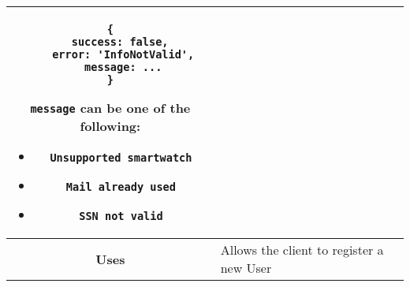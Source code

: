 \begin{adjustwidth}{1cm}{}
\begin{longtable}{|c|l|}
\begin{minipage}[t]{0.7\textwidth}
\begin{adjustwidth}{1.5cm}{}
                \begin{verbatim}
{
    success: false, 
    error: 'InfoNotValid',
    message: ...
}
                \end{verbatim}
                \end{adjustwidth}
                \texttt{message} can be one of the following: 
                \begin{itemize}
                    \item \texttt{Unsupported smartwatch}
                    \item \texttt{Mail already used}
                    \item \texttt{SSN not valid}
                \end{itemize}
              \end{minipage} \\
              \hline
            \textbf{Uses} & Allows the client to register a new User \\
            \hline
        \end{longtable}
    \end{adjustwidth}

